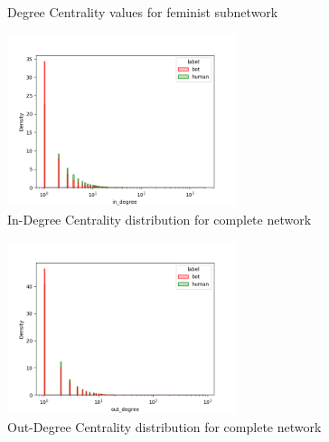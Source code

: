 \documentclass[12pt, a4paper]{article}
\begin{document}
\begin{itemize}
\begin{figure}[H]
    				\caption{Degree Centrality values for feminist subnetwork}
				\end{figure}
                \begin{figure}[H]
                    \centering
                    \includegraphics[width=0.6\textwidth]{results/complete_in_degree.png}
                    \caption{In-Degree Centrality distribution for complete network}
                    \label{fig:in-degree}
                \end{figure}
                \begin{figure}[H]
                    \centering
                    \includegraphics[width=0.6\textwidth]{results/complete_out_degree.png}
                    \caption{Out-Degree Centrality distribution for complete network}
                    \label{fig:out-degree}
                \end{figure}
				\begin{figure}[H]
    				\centering
    				\begin{minipage}[b]{0.49\textwidth}    				
        				\centering
        				\setlength{\fboxsep}{0pt}
    					\setlength{\fboxrule}{0.5pt}

\end{minipage}
\end{figure}
\end{itemize}
\end{document}
